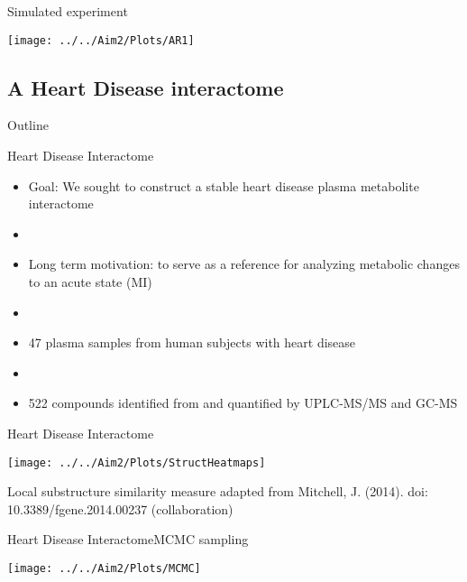 \documentclass[xcolor=dvipsnames]{beamer}
\begin{document}
\begin{frame}{Simulated experiment}
	\begin{center}
		\texttt{[image: ../../Aim2/Plots/AR1]}
	\end{center}
\end{frame}

\subsection{A Heart Disease interactome}
\begin{frame}{Outline}
	\vspace{-10.5pt}
	\tableofcontents[currentsection,subsectionstyle=show/shaded/hide]
\end{frame}
\begin{frame}{Heart Disease Interactome}
	\vspace{-15.5pt}
	\begin{itemize}
		\item Goal: We sought to construct a stable heart disease plasma metabolite interactome \pause
		\item[]
		\item Long term motivation:  to serve as a reference for analyzing metabolic changes to an acute state (MI) \pause
		\item[]
		\item 47 plasma samples from human subjects with heart disease \pause
		\item[]
		\item 522 compounds identified from and quantified by UPLC-MS/MS and GC-MS
	\end{itemize}
\end{frame}

\begin{frame}{Heart Disease Interactome}
		\vspace{-15.5pt}
	\begin{center}
		\texttt{[image: ../../Aim2/Plots/StructHeatmaps]}
		
		Local substructure similarity measure adapted from Mitchell, J. (2014). doi: 10.3389/fgene.2014.00237 (collaboration)
	\end{center}
\end{frame}

\begin{frame}{Heart Disease Interactome}{MCMC sampling}
	\vspace{-10.5pt}
	\begin{center}
		\texttt{[image: ../../Aim2/Plots/MCMC]}
	\end{center}
\end{frame}
\end{document}
